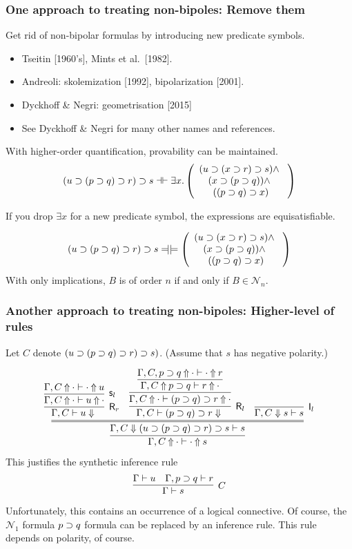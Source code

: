 \documentclass[9pt]{beamer}
\begin{document}
\begin{frame}
\frametitle{One approach to treating non-bipoles: Remove them}

Get rid of non-bipolar formulas by introducing new predicate symbols.

\begin{itemize}
\item Tseitin [1960's], Mints et al.~[1982].
\item Andreoli: skolemization [1992], bipolarization [2001].
\item Dyckhoff \& Negri: geometrisation [2015]
\item See Dyckhoff \& Negri for many other names and references.
\end{itemize}

\vfill\pause
With higher-order quantification, provability can be maintained.
\[
  (u\supset (p\supset q)\supset r) \supset s \dashv\vdash \exists x. 
\left(\begin{array}{c}
    (u\supset(x\supset r) \supset s) \wedge~\\
    (x\supset (p\supset q))  \wedge~\\
    ((p\supset q)\supset x)
\end{array}
\right)
\]

If you drop $\exists x$ for a new predicate symbol, the expressions
are equisatisfiable.

\newcommand{\sledom}{\Relbar\joinrel\mathrel{|}}

\[
  (u\impl (p\impl q)\impl r) \impl s \sledom \models
\left(\begin{array}{c}
    (u\impl (x\impl r) \impl s) \wedge~\\
    (x\impl (p\impl q))  \wedge~\\
    ((p\impl q)\impl x)
\end{array}
\right)
\]
\vfill
With only implications, $B$ is of order $n$ if and only if $B\in\mathcal{N}_n$.
\vfill
\end{frame}

\begin{frame}
\frametitle{Another approach to treating non-bipoles: Higher-level of rules}

Let $C$ denote $(u\supset (p\supset q)\supset r) \supset s)$.  (Assume that
$s$ has negative polarity.)

\[
  \infer{\jUnf{\Gamma, C}{\cdot}{\cdot}{s}}{
  \infer={\jLf{\Gamma, C}{(u\impl (p\impl q)\impl r) \impl s}{s}}{
    \infer[\krelease_r]{\jRf{\Gamma,C}{u}}{
       \infer[\kstore_l]{\jUnf{\Gamma,C}{\cdot}{u}{\cdot}}
                        {\jUnf{\Gamma,C}{\cdot}{\cdot}{u}}}
& 
  \infer[\krelease_l]{\jRf{\Gamma,C}{(p\impl q)\impl r}}{
  \infer{\jUnf{\Gamma,C}{\cdot}{(p\impl q)\impl r}{\cdot}}{
  \infer{\jUnf{\Gamma,C}{p\impl q}{r}{\cdot}}{
\jUnf{\Gamma,C,p\impl q}{\cdot}{\cdot}{r}
}}}
& 
    \infer[\kinit_l]{\jLf{\Gamma,C}{s}{s}}{}
}}
\]
This justifies the synthetic inference rule
\[
  \infer[C]{\Gamma\seq s}{ \Gamma\seq u & \Gamma,p\impl q \seq r}
\]
Unfortunately, this contains an occurrence of a logical connective.
\vfill
Of course, the $\mathcal{N}_1$ formula $p\supset q$ formula can be
replaced by an inference rule.  This rule depends on polarity, of
course. 
\vfill
\end{frame}
\end{document}
